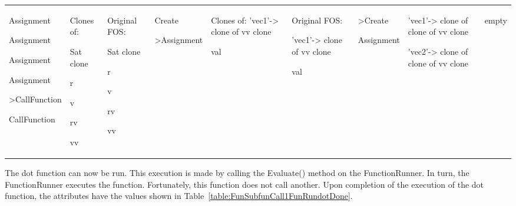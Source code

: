 \begin{center}
\begin{supertabular}{|p{0.75in}|p{0.45in}|p{0.45in}|p{0.69in}|p{0.45in}|p{0.45in}|p{0.69in}|
p{0.44in}|p{0.44in}|}
\begin{small}
Assignment

Assignment

Assignment

Assignment

>CallFunction

CallFunction
\end{small} &
\begin{small}
Clones of:

Sat clone

r

v

rv

vv
\end{small} &
\begin{small}
Original FOS:

Sat clone

r

v

rv

vv
\end{small} &
\begin{small}
Create

>Assignment
\end{small} &
\begin{small}
Clones of: 
'vec1'-> clone of vv clone

val
\end{small} &
\begin{small}
Original FOS:

'vec1'-> clone of vv clone

val
\end{small} &
\begin{small}
>Create

Assignment
\end{small} &
\begin{small}
'vec1'-> clone of clone of vv clone

'vec2'-> clone of clone of vv clone
\end{small} &
\begin{small}
empty
\end{small} \\
\end{supertabular}
\end{center}

The dot function can now be run.  This execution is made by calling the Evaluate() method on the
FunctionRunner.  In turn, the FunctionRunner executes the function.  Fortunately, this function does
not call another.  Upon completion of the execution of the dot function, the attributes have the
values shown in Table~\ref{table:FunSubfunCall1FunRundotDone}.

